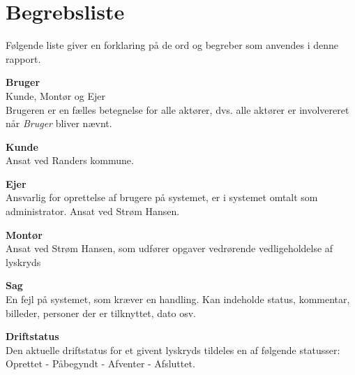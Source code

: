 \section{Begrebsliste}
Følgende liste giver en forklaring på de ord og begreber som anvendes i denne rapport.

\textbf{Bruger}\\Kunde, Montør og Ejer\\
\indent Brugeren er en fælles betegnelse for alle aktører, dvs. alle aktører er involvereret når \emph{Bruger} bliver nævnt. 

\textbf{Kunde}\\Ansat ved Randers kommune. 

\textbf{Ejer}\\Ansvarlig for oprettelse af brugere på systemet, er i systemet omtalt som administrator. Ansat ved Strøm Hansen.

\textbf{Montør}\\Ansat ved Strøm Hansen, som udfører opgaver vedrørende vedligeholdelse af lyskryds

\textbf{Sag}\\En fejl på systemet, som kræver en handling. Kan indeholde status, kommentar, billeder, personer der er tilknyttet, dato osv.

\textbf{Driftstatus}\\Den aktuelle driftstatus for et givent lyskryds tildeles en af følgende statusser: Oprettet - Påbegyndt - Afventer - Afsluttet.